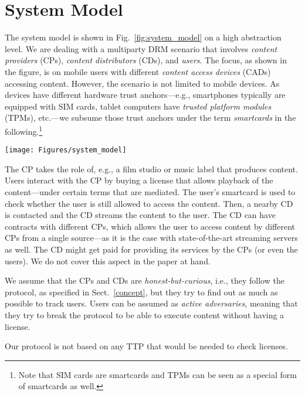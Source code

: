 \documentclass{llncs}
\newcommand{\refSec}[1]{Sect.~\ref{#1}}
\newcommand{\refFig}[1]{Fig.~\ref{#1}}
\begin{document}
\section{System Model} \label{system_model}

The system model is shown in \refFig{fig:system_model} on a high abstraction level. We are dealing with a multiparty DRM scenario that involves \emph{content providers} (CPs), \emph{content distributors} (CDs), and \emph{users}. The focus, as shown in the figure, is on mobile users with different \emph{content access devices} (CADs) accessing content. However, the scenario is not limited to mobile devices. As devices have different hardware trust anchors---e.g., smartphones typically are equipped with SIM cards, tablet computers have \emph{trusted platform modules} (TPMs), etc.---we subsume those trust anchors under the term \emph{smartcards} in the following.\footnote{Note that SIM cards are smartcards and TPMs can be seen as a special form of smartcards as well.}

\begin{figure*}[ht]
	\centering
	\texttt{[image: Figures/system\_model]}
	\caption{System model of a multiparty DRM scenario.}
	\label{fig:system_model}
\end{figure*}


The CP takes the role of, e.g., a film studio or music label that produces content. Users interact with the CP by buying a license that allows playback of the content---under certain terms that are mediated. The user's smartcard is used to check whether the user is still allowed to access the content. Then, a nearby CD is contacted and the CD streams the content to the user. The CD can have contracts with different CPs, which allows the user to access content by different CPs from a single source---as it is the case with state-of-the-art streaming servers as well. The CD might get paid for providing its services by the CPs (or even the users). We do not cover this aspect in the paper at hand. 


We assume that the CPs and CDs are \emph{honest-but-curious}, i.e., they follow the protocol, as specified in \refSec{concept}, but they try to find out as much as possible to track users. Users can be assumed as \emph{active adversaries}, meaning that they try to break the protocol to be able to execute content without having a license. 


Our protocol is not based on any TTP that would be needed to check licenses.
\end{document}

